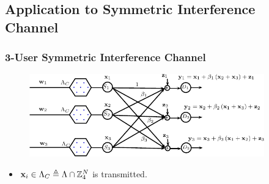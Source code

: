 \documentclass[10pt]{beamer}
\begin{document}
\subsection{Application to Symmetric Interference Channel}
\begin{frame}\frametitle{3-User Symmetric Interference Channel}
	\begin{figure}
	\centering
    \includegraphics[width=4in]{IC_model_ISIT_3user.pdf}
	\end{figure}
\pause
\begin{itemize}
\item $\mathbf{x}_{i}\in \Lambda_{C}\triangleq \Lambda \cap \mathbb{Z}_{4}^{N}$ is transmitted.
\vspace{0.2in}
\end{itemize}
\end{frame}
\end{document}

